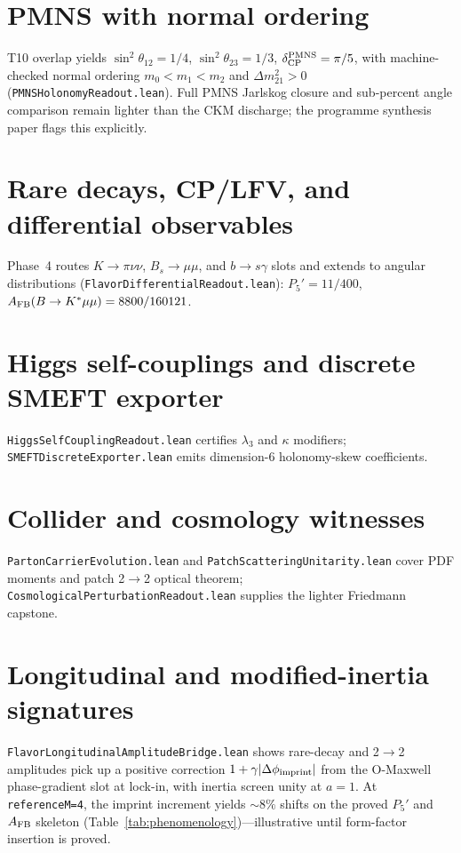 \documentclass[11pt]{amsart}
\begin{document}
\section{PMNS with normal ordering}
T10 overlap yields $\sin^2\theta_{12}=1/4$, $\sin^2\theta_{23}=1/3$,
$\delta_{\rm CP}^{\rm PMNS}=\pi/5$, with machine-checked normal ordering
$m_0<m_1<m_2$ and $\Delta m^2_{21}>0$ (\texttt{PMNSHolonomyReadout.lean}).
Full PMNS Jarlskog closure and sub-percent angle comparison remain lighter than the CKM
discharge; the programme synthesis paper flags this explicitly.

\section{Rare decays, CP/LFV, and differential observables}
Phase~4 routes $K\to\pi\nu\nu$, $B_s\to\mu\mu$, and $b\to s\gamma$ slots and extends
to angular distributions (\texttt{FlavorDifferentialReadout.lean}):
$P_5'=11/400$, $A_{\rm FB}(B\to K^*\mu\mu)=8800/160121$.


\section{Higgs self-couplings and discrete SMEFT exporter}
\texttt{HiggsSelfCouplingReadout.lean} certifies $\lambda_3$ and $\kappa$ modifiers;
\texttt{SMEFTDiscreteExporter.lean} emits dimension-6 holonomy-skew coefficients.

\section{Collider and cosmology witnesses}
\texttt{PartonCarrierEvolution.lean} and \texttt{PatchScatteringUnitarity.lean}
cover PDF moments and patch 2$\to$2 optical theorem;
\texttt{CosmologicalPerturbationReadout.lean} supplies the lighter Friedmann capstone.

\section{Longitudinal and modified-inertia signatures}
\texttt{FlavorLongitudinalAmplitudeBridge.lean} shows rare-decay and 2$\to$2 amplitudes
pick up a positive correction $1+\gamma|\Delta\phi_{\rm imprint}|$ from the O-Maxwell
phase-gradient slot at lock-in, with inertia screen unity at $a=1$.
At \texttt{referenceM=4}, the imprint increment yields $\sim 8\%$ shifts on the
proved $P_5'$ and $A_{\rm FB}$ skeleton (Table~\ref{tab:phenomenology})---illustrative
until form-factor insertion is proved.

\end{document}
